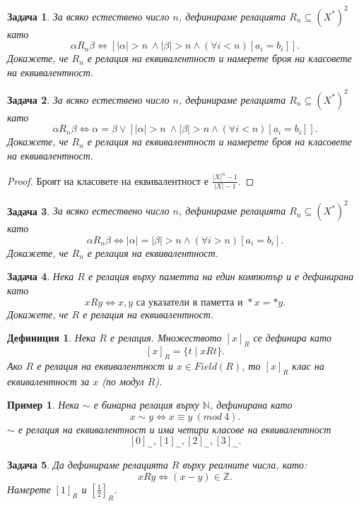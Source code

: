 \documentclass[a4paper]{article}
\newtheorem{dfn}{Дефиниция}
\newtheorem{problem}{Задача}
\newtheorem{example}{Пример}
\newcommand{\Z}{\mathbb{Z}}
\newcommand{\N}{\mathbb{N}}
\begin{document}
\begin{problem}
  За всяко естествено число $n$, дефинираме релацията $R_n \subseteq (X^*)^2$ като
  \[\alpha R_n \beta \iff [|\alpha| > n\ \wedge |\beta| > n\wedge (\forall i < n)[a_i = b_i]].\]
  Докажете, че $R_n$ е релация на еквивалентност и намерете броя на класовете на еквивалентност.
\end{problem}

\begin{problem}
  За всяко естествено число $n$, дефинираме релацията $R_n \subseteq (X^*)^2$ като
  \[\alpha R_n \beta \iff \alpha = \beta \vee [|\alpha| > n\ \wedge |\beta| > n\wedge (\forall i < n)[a_i = b_i]].\]
  Докажете, че $R_n$ е релация на еквивалентност и намерете броя на класовете на еквивалентност.
\end{problem}
\begin{proof}
  Броят на класовете на еквивалентност е $\frac{|X|^n - 1}{|X| - 1}$.
\end{proof}


\begin{problem}
  За всяко естествено число $n$, дефинираме релацията $R_n \subseteq (X^*)^2$ като
  \[\alpha R_n \beta \iff |\alpha| = |\beta| > n\wedge (\forall i > n)[a_i = b_i].\]
  Докажете, че $R_n$ е релация на еквивалентност.
\end{problem}

\begin{problem}
  Нека $R$ е релация върху паметта на един компютър и е дефинирана като
  \[xRy \iff x,y\mbox{ са указатели в паметта и }*x = *y.\]
  Докажете, че $R$ е релация на еквивалентност.
\end{problem}



\begin{dfn}
  Нека $R$ е релация.
  Множеството $[x]_R$ се дефинира като
  \[[x]_R = \{t\mid xRt\}.\]
  Ако $R$ е релация на еквивалентност и $x\in Field(R)$, то $[x]_R$ клас на еквивалентност за $x$ (по модул $R$).
\end{dfn}

\begin{example}
  Нека $\sim$ е бинарна релация върху $\N$, дефинирана като
  \[x\sim y \iff x\equiv y\ (mod\ 4).\]
  $\sim$ е релация на еквивалентност и има четири класове на еквивалентност
  \[[0]_\sim, [1]_\sim, [2]_\sim, [3]_\sim.\]
\end{example}

\begin{problem}
  Да дефинираме релацията $R$ върху реалните числа, като:
  \[xRy \iff (x-y)\in\Z.\]
  Намерете $[1]_R$ и $[\frac{1}{2}]_R$.
\end{problem}
\end{document}

